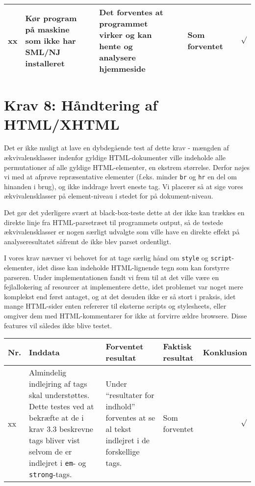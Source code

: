 \documentclass[a4paper,oneside,article]{memoir}
\begin{document}
\begin{landscape}
\begin{longtable}[c]{p{20pt}|p{220pt}|p{130pt}|p{130pt}|r}
xx &
Kør program på maskine som ikke har SML/NJ installeret &&
Det forventes at programmet virker og kan hente og analysere hjemmeside &&
Som forventet &&
$\surd$ \\ \hline

\end{longtable}

\section{Krav 8: Håndtering af HTML/XHTML}

Det er ikke muligt at lave en dybdegående test af dette krav - mængden
af ækvivalensklasser indenfor gyldige HTML-dokumenter ville indeholde
alle permutationer af alle gyldige HTML-elementer, en ekstrem
størrelse. Derfor nøjes vi med at afprøve repræsentative elementer
(f.eks. minder \texttt{br} og \texttt{hr} en del om hinanden i brug),
og ikke inddrage hvert eneste tag. Vi placerer så at sige vores
ækvivalensklasser på element-niveau i stedet for på dokument-niveau.

Det gør det yderligere svært at black-box-teste dette at der ikke kan
trækkes en direkte linje fra HTML-parsetræet til programmets output,
så de testede ækvivalensklasser er nogen særligt udvalgte som ville
have en direkte effekt på analyseresultatet såfremt de ikke blev
parset ordentligt.

I vores krav nævner vi behovet for at tage særlig hånd om
\texttt{style} og \texttt{script}-elementer, idet disse kan indeholde
HTML-lignende tegn som kan forstyrre parseren. Under implementationen
fandt vi frem til at det ville være en fejlallokering af resourcer at
implementere dette, idet problemet var noget mere komplekst end først
antaget, og at det desuden ikke er så stort i praksis, idet mange
HTML-sider enten refererer til eksterne scripts og stylesheets, eller
omgiver dem med HTML-kommentarer for ikke at forvirre ældre
browsere. Disse features vil således ikke blive testet.

\begin{longtable}[c]{p{20pt}|p{220pt}|p{130pt}|p{130pt}|r}
\textbf{Nr.} &
\textbf{Inddata} &
\textbf{Forventet resultat} &
\textbf{Faktisk resultat} &
\textbf{Konklusion} \\ \hline

xx &
Almindelig indlejring af tags skal understøttes. 
Dette testes ved at bekræfte at de i krav 3.3 beskrevne tags bliver vist selvom de er indlejret i \texttt{em}- og \texttt{strong}-tags. &
Under ``resultater for indhold'' forventes at se al tekst indlejret i de forskellige tags. &
Som forventet &
$\surd$ \\ \hline


\end{longtable}
\end{landscape}
\end{document}
